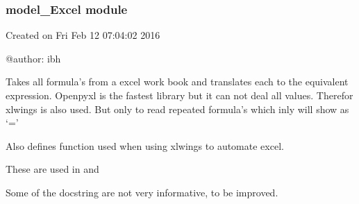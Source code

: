 \documentclass[letterpaper,10pt,english]{sphinxmanual}
\begin{document}
\sphinxstepscope


\subsubsection{model\_Excel module}
\label{\detokenize{onboard/model_Excel:module-model_Excel}}\label{\detokenize{onboard/model_Excel:model-excel-module}}\label{\detokenize{onboard/model_Excel::doc}}
\sphinxAtStartPar
Created on Fri Feb 12 07:04:02 2016

\sphinxAtStartPar
@author: ibh

\sphinxAtStartPar
Takes all formula’s  from a excel work book and translates each to the equivalent expression.
Openpyxl is the fastest library but it can not deal all values. Therefor xlwings is also used.
But only to read repeated formula’s which inly will show as ‘=’

\sphinxAtStartPar
Also defines function used when using xlwings to automate excel.

\sphinxAtStartPar
These are used in {\hyperref[\detokenize{core/modelclass:modelclass.Excel_Mixin.modeldump_excel}]{}} and {\hyperref[\detokenize{core/modelclass:modelclass.Excel_Mixin.modelload_excel}]{}}

\sphinxAtStartPar
Some of the docstring are not very informative, to be improved.
\end{document}

